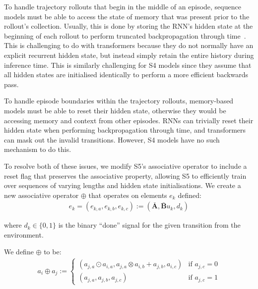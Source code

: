 \documentclass{article}
\newcommand{\newop}{\oplus}
\begin{document}
To handle trajectory rollouts that begin in the middle of an episode, sequence models must be able to access the state of memory that was present prior to the rollout's collection. Usually, this is done by storing the RNN's hidden state at the beginning of each rollout to perform truncated backpropagation through time~\citep{williams1995gradient}. This is challenging to do with transformers because they do not normally have an explicit recurrent hidden state, but instead simply retain the entire history during inference time. This is similarly challenging for S4 models since they assume that all hidden states are initialised identically to perform a more efficient backwards pass. 

To handle episode boundaries within the trajectory rollouts, memory-based models must be able to reset their hidden state, otherwise they would be accessing memory and context from other episodes. RNNs can trivially reset their hidden state when performing backpropagation through time, and transformers can mask out the invalid transitions. However, S4 models have no such mechanism to do this. 

To resolve both of these issues, we modify S5's associative operator to include a reset flag that preserves the associative property, allowing S5 to efficiently train over sequences of varying lengths and hidden state initialisations. We create a new associative operator $\newop$ that operates on elements $e_k$ defined:
\begin{align}
e_k = (e_{k,a}, e_{k,b}, e_{k,c}) := (\mathbf{\bar{A}}, \mathbf{\bar{B}}u_k, d_k)
\end{align}

 where $d_k \in \{0, 1\}$ is the binary ``done'' signal for the given transition from the environment.  

We define $\newop$ to be:
\begin{align}
a_i \newop a_j := 
\begin{cases}
(a_{j,a} \odot a_{i,a}, a_{j,a} \otimes a_{i, b} + a_{j, b}, a_{i, c}) & \text{if $a_{j,c}=0$}\\
(a_{j,a}, a_{j,b}, a_{j,c}) & \text{if $a_{j,c}=1$} \nonumber
\end{cases}
\end{align}
\end{document}
